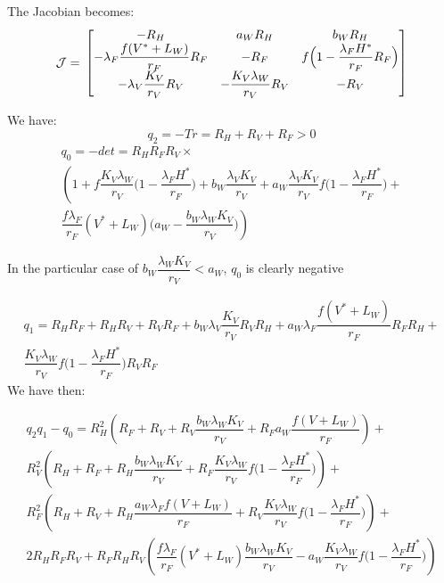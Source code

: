 \documentclass{article}
\newcommand{\lfw}{\lambda_{F}}
\newcommand{\lvw}{\lambda_{V}}
\newcommand{\lfv}{\lambda_{W}}
\begin{document}
\begin{itemize}
The Jacobian becomes:
\begin{equation}
\mathcal{J} = \\
\begin{bmatrix}
-R_H & a_W R_H & b_W R_H \\
-\lfw \dfrac{f(V^* + L_W)}{r_F}R_F & -R_F & f \Big(1 - \dfrac{\lfw H^*}{r_F} R_F \Big)\\
-\lvw \dfrac{K_V}{r_V} R_V & -\dfrac{K_V \lfv}{r_V} R_V & -R_V
\end{bmatrix}
\end{equation}

We have:
$$
q_2 = -Tr = R_H + R_V + R_F  > 0
$$
\begin{multline*}
q_0 = - det = R_H R_F R_V \times \\
\left(1 + f \dfrac{K_V \lfv}{r_V} \Big(1 - \dfrac{\lfw H^*}{r_F}\Big) + b_W \dfrac{\lvw K_V}{r_V} + a_W \dfrac{\lvw K_V}{r_V} f\Big(1 - \dfrac{\lfw H^*}{r_F}\Big) + \right. \\ \left. 
\dfrac{f\lfw}{r_F}(V^* + L_W) \Big(a_W - \dfrac{b_W \lfv K_V}{r_V} \Big)  \right)
\end{multline*}

In the particular case of $b_W \dfrac{\lfv K_V}{r_V} < a_W$, $q_0$ is clearly negative

\begin{multline*}
q_1 = R_H R_F + R_H R_V + R_V R_F + b_W \lvw \dfrac{K_V}{r_V} R_V R_H + a_W \lfw \dfrac{f(V^* + L_W)}{r_F}R_F R_H + \\ \dfrac{K_V \lfv}{r_V}f \Big(1 - \dfrac{\lfw H^*}{r_F} \Big) R_V R_F
\end{multline*}
We have then:


\begin{multline}
q_2q_1 - q_0 = R_H^2 \left(R_F + R_V + R_V \dfrac{b_W \lfv K_V}{r_V} + R_F a_W \dfrac{f(V+L_W)}{r_F} \right) + \\
R_V^2 \left(R_H + R_F + R_H\dfrac{b_W \lfv K_V}{r_V} + R_F \dfrac{K_V \lfv}{r_V}f \Big(1 - \dfrac{\lfw H^*}{r_F} \Big) \right) + \\
R_F^2 \left( R_H + R_V + R_H \dfrac{a_W \lfw f (V+L_W)}{r_F} + R_V\dfrac{K_V \lfv}{r_V}f \Big(1 - \dfrac{\lfw H^*}{r_F} \Big) \right) + \\
 2 R_H R_F R_V + R_FR_HR_V \left(\dfrac{f\lfw}{r_F}(V^* + L_W)\dfrac{b_W \lfv K_V}{r_V} - a_W \dfrac{K_V \lfv}{r_V}f \Big(1 - \dfrac{\lfw H^*}{r_F} \Big)  \right)
\end{multline}

\end{itemize}
\end{document}
